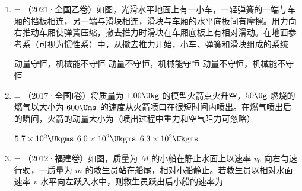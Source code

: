 \documentclass[\gkver]{gaokaozhenti}
\makeatletter
\newcommand{\tiinfo}[2]{{\small\color{gray}（#1）\textcolor{orange!85!black}{\nandu{#2}}}\hspace{0.4em}}
\newenvironment{tibody}
  {\begin{minipage}[t]{\linewidth}\@listdepth=\@ne\leavevmode\ignorespaces}
  {\end{minipage}}
\makeatother
\begin{document}
\begin{enumerate}[resume=tiku]
\item
\begin{tibody}
\tiinfo{2021·全国乙卷}{1}如图，光滑水平地面上有一小车，一轻弹簧的一端与车厢的挡板相连，另一端与滑块相连，滑块与车厢的水平底板间有摩擦。用力向右推动车厢使弹簧压缩，撤去推力时滑块在车厢底板上有相对滑动。在地面参考系（可视为惯性系）中，从撤去推力开始，小车、弹簧和滑块组成的系统 


{动量守恒，机械能不守恒}
{动量不守恒，机械能守恒}
{动量不守恒，机械能不守恒}
\end{tibody}


\item
\begin{tibody}
\tiinfo{2017·全国Ⅰ卷}{1}将质量为 $1.00\Ukg$ 的模型火箭点火升空，$50\Ug$ 燃烧的燃气以大小为 $600\Ums$ 的速度从火箭喷口在很短时间内喷出。在燃气喷出后的瞬间，火箭的动量大小为（喷出过程中重力和空气阻力可忽略）

\fourchoices[answer=A]
{$30\Ukgms$}
{$5.7\times10^{2}\Ukgms$}
{$6.0\times10^{2}\Ukgms$}
{$6.3\times10^{2}\Ukgms$}
\end{tibody}


\item
\begin{tibody}
\tiinfo{2012·福建卷}{2}如图，质量为 $M$ 的小船在静止水面上以速率 $v_{0}$ 向右匀速行驶，一质量为 $m$ 的救生员站在船尾，相对小船静止。若救生员以相对水面速率 $v$ 水平向左跃入水中，则救生员跃出后小船的速率为


\end{tibody}
\end{enumerate}
\end{document}
